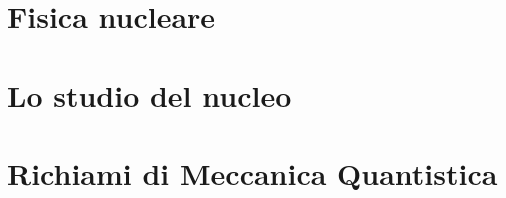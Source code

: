 \documentclass{tufte-book} %
\theoremstyle{definition}
\theoremstyle{theorem}
\theoremstyle{plain}
\theoremstyle{remark}
\theoremstyle{remark}
\begin{document}





\cleardoublepage


\cleardoublepage

\setcounter{chapter}{1}

\chapter{Fisica nucleare}\label{ch:fisica-nucleare}

       
\setcounter{chapter}{2}
\setcounter{section}{0}
\setcounter{equation}{0}
\setcounter{figure}{0}

\chapter{Lo studio del nucleo}\label{ch:studio-del-nucleo}

       
\setcounter{chapter}{3}
\setcounter{section}{0}
\setcounter{equation}{0}
\setcounter{figure}{0}


\chapter{Richiami di Meccanica Quantistica}\label{ch:richiami-qm}


\setcounter{chapter}{4}
\setcounter{section}{0}
\setcounter{equation}{0}
\setcounter{figure}{0}
\end{document}
